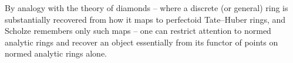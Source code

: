 \begin{remark}
\label{rmk:20:reconstruction}
By analogy with the theory of diamonds -- where a discrete (or general) ring is
substantially recovered from how it maps to perfectoid Tate--Huber rings, and
Scholze remembers only such maps -- one can restrict attention to normed
analytic rings and recover an object essentially from its functor of points on
normed analytic rings alone.
\end{remark}
